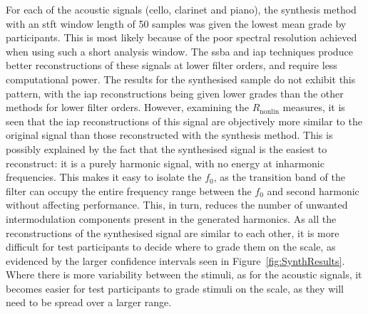 		For each of the acoustic signals (cello, clarinet and piano), the synthesis method with an \acrshort{stft}
		window length of 50 samples was given the lowest mean grade by participants. This is most likely because of
		the poor spectral resolution achieved when using such a short analysis window. The \acrshort{ssba} and
		\acrshort{iap} techniques produce better reconstructions of these signals at lower filter orders, and
		require less computational power. The results for the synthesised sample do not exhibit this pattern, with
		the \acrshort{iap} reconstructions being given lower grades than the other methods for lower filter orders.
		However, examining the $R_{\mathrm{nonlin}}$ measures, it is seen that the \acrshort{iap} reconstructions
		of this signal are objectively more similar to the original signal than those reconstructed with the
		synthesis method. This is possibly explained by the fact that the synthesised signal is the easiest to
		reconstruct: it is a purely harmonic signal, with no energy at inharmonic frequencies. This makes it easy
		to isolate the $f_{0}$, as the transition band of the filter can occupy the entire frequency range between
		the $f_{0}$ and second harmonic without affecting performance. This, in turn, reduces the number of
		unwanted intermodulation components present in the generated harmonics. As all the reconstructions of the
		synthesised signal are similar to each other, it is more difficult for test participants to decide where to
		grade them on the scale, as evidenced by the larger confidence intervals seen in
		Figure~\ref{fig:SynthResults}. Where there is more variability between the stimuli, as for the acoustic
		signals, it becomes easier for test participants to grade stimuli on the scale, as they will need to be
		spread over a larger range.


